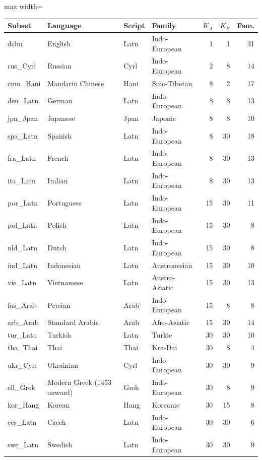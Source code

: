 \begin{table}[p]
\centering
\tiny
\setlength{\tabcolsep}{2.5pt}
\begin{minipage}[t]{0.49\textwidth}\centering
\begin{adjustbox}{max width=\linewidth}
\begin{tabular}[t]{llllrrr}
\toprule
Subset & Language & Script & Family & $K_A$ & $K_B$ & Fam. \\
\midrule
dclm & English & Latn & Indo-European & 1 & 1 & 31 \\
rus\_Cyrl & Russian & Cyrl & Indo-European & 2 & 8 & 14 \\
cmn\_Hani & Mandarin Chinese & Hani & Sino-Tibetan & 8 & 2 & 17 \\
deu\_Latn & German & Latn & Indo-European & 8 & 8 & 13 \\
jpn\_Jpan & Japanese & Jpan & Japonic & 8 & 8 & 10 \\
spa\_Latn & Spanish & Latn & Indo-European & 8 & 30 & 18 \\
fra\_Latn & French & Latn & Indo-European & 8 & 30 & 13 \\
ita\_Latn & Italian & Latn & Indo-European & 8 & 30 & 13 \\
por\_Latn & Portuguese & Latn & Indo-European & 15 & 30 & 11 \\
pol\_Latn & Polish & Latn & Indo-European & 15 & 30 & 8 \\
nld\_Latn & Dutch & Latn & Indo-European & 15 & 30 & 8 \\
ind\_Latn & Indonesian & Latn & Austronesian & 15 & 30 & 10 \\
vie\_Latn & Vietnamese & Latn & Austro-Asiatic & 15 & 30 & 13 \\
fas\_Arab & Persian & Arab & Indo-European & 15 & 8 & 8 \\
arb\_Arab & Standard Arabic & Arab & Afro-Asiatic & 15 & 30 & 14 \\
tur\_Latn & Turkish & Latn & Turkic & 30 & 30 & 10 \\
tha\_Thai & Thai & Thai & Kra-Dai & 30 & 8 & 4 \\
ukr\_Cyrl & Ukrainian & Cyrl & Indo-European & 30 & 30 & 9 \\
ell\_Grek & Modern Greek (1453 onward) & Grek & Indo-European & 30 & 8 & 9 \\
kor\_Hang & Korean & Hang & Koreanic & 30 & 15 & 8 \\
ces\_Latn & Czech & Latn & Indo-European & 30 & 30 & 6 \\
swe\_Latn & Swedish & Latn & Indo-European & 30 & 30 & 9 \\

\end{tabular}
\end{adjustbox}
\end{minipage}
\end{table}
